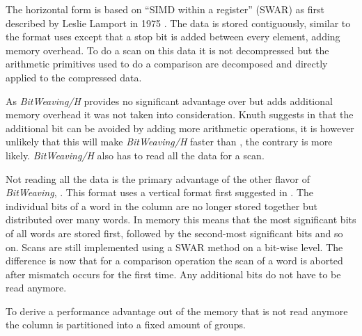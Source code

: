 The horizontal form is based on ``SIMD within a register'' (SWAR) as first
described by Leslie Lamport in 1975 \cite{SWAR}. The data is stored
contiguously, similar to the format \simdscan{} uses except that a stop bit is
added between every element, adding memory overhead. To do a scan on this data
it is not decompressed but the arithmetic primitives used to do a comparison are
decomposed and directly applied to the compressed data.

As \emph{BitWeaving/H} provides no significant advantage over \simdscan{} but
adds additional memory overhead it was not taken into consideration. Knuth
suggests in \cite{SWAR} that the additional bit can be avoided by adding more
arithmetic operations, it is however unlikely that this will make
\emph{BitWeaving/H} faster than \simdscan{}, the contrary is more likely.
\emph{BitWeaving/H} also has to read all the data for a scan.


Not reading all the data is the primary advantage of the other flavor of
\emph{BitWeaving}, \bwv{}. This format uses a vertical format first suggested in
\cite{oneill}. The individual bits of a word in the column are no longer stored
together but distributed over many words. In memory this means that the most
significant bits of all words are stored first, followed by the second-most
significant bits and so on. Scans are still implemented using a SWAR method on a
bit-wise level. The difference is now that for a comparison operation the scan
of a word is aborted after mismatch occurs for the first time. Any additional
bits do not have to be read anymore.

To derive a performance advantage out of the memory that is not read anymore the
column is partitioned into a fixed amount of groups.

\section{\bs{}}
